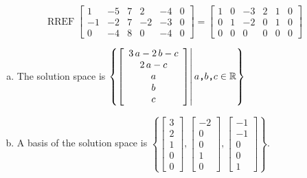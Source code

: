 \begin{exerciseAnswer} 


\[\operatorname{RREF} \left[\begin{array}{ccccc|c}
1 & -5 & 7 & 2 & -4 & 0 \\
-1 & -2 & 7 & -2 & -3 & 0 \\
0 & -4 & 8 & 0 & -4 & 0
\end{array}\right] = \left[\begin{array}{ccccc|c}
1 & 0 & -3 & 2 & 1 & 0 \\
0 & 1 & -2 & 0 & 1 & 0 \\
0 & 0 & 0 & 0 & 0 & 0
\end{array}\right] \]


\begin{enumerate}[(a)]
\item The solution space is \( \left\{ \left[\begin{array}{c}
3 \, a - 2 \, b - c \\
2 \, a - c \\
a \\
b \\
c
\end{array}\right] \middle|\,a\text{\texttt{,}}b\text{\texttt{,}}c\in\mathbb{R}\right\} \)
\item A basis of the solution space is \( \left\{ \left[\begin{array}{c}
3 \\
2 \\
1 \\
0 \\
0
\end{array}\right] , \left[\begin{array}{c}
-2 \\
0 \\
0 \\
1 \\
0
\end{array}\right] , \left[\begin{array}{c}
-1 \\
-1 \\
0 \\
0 \\
1
\end{array}\right] \right\} \).
\end{enumerate}
    
\end{exerciseAnswer}
    
